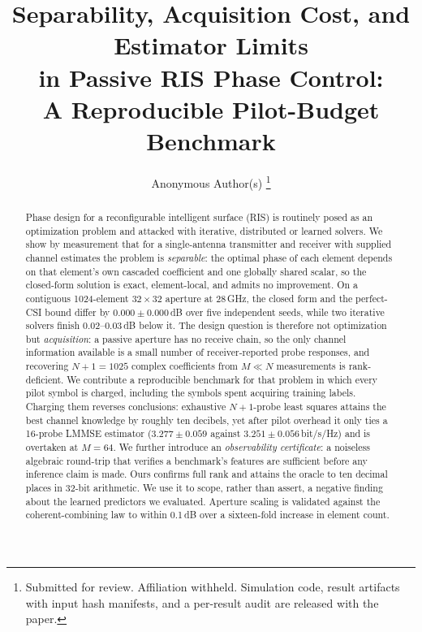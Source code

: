 \documentclass[journal]{IEEEtran}
\newcommand{\dB}{\,dB\xspace}
\begin{document}
\title{Separability, Acquisition Cost, and Estimator Limits\\ in Passive RIS Phase Control:\\ A Reproducible Pilot-Budget Benchmark}

\author{Anonymous Author(s)%
\thanks{Submitted for review. Affiliation withheld. Simulation code, result artifacts with input hash manifests, and a per-result audit are released with the paper.}}


\maketitle

\begin{abstract}
Phase design for a reconfigurable intelligent surface (RIS) is routinely posed as an optimization problem and attacked with iterative, distributed or learned solvers. We show by measurement that for a single-antenna transmitter and receiver with supplied channel estimates the problem is \emph{separable}: the optimal phase of each element depends on that element's own cascaded coefficient and one globally shared scalar, so the closed-form solution is exact, element-local, and admits no improvement. On a contiguous 1024-element $32\times32$ aperture at 28\,GHz, the closed form and the perfect-CSI bound differ by $0.000\pm0.000$\dB over five independent seeds, while two iterative solvers finish 0.02--0.03\dB below it. The design question is therefore not optimization but \emph{acquisition}: a passive aperture has no receive chain, so the only channel information available is a small number of receiver-reported probe responses, and recovering $N+1=1025$ complex coefficients from $M\ll N$ measurements is rank-deficient. We contribute a reproducible benchmark for that problem in which every pilot symbol is charged, including the symbols spent acquiring training labels. Charging them reverses conclusions: exhaustive $N+1$-probe least squares attains the best channel knowledge by roughly ten decibels, yet after pilot overhead it only ties a 16-probe LMMSE estimator ($3.277\pm0.059$ against $3.251\pm0.056$\,bit/s/Hz) and is overtaken at $M=64$. We further introduce an \emph{observability certificate}: a noiseless algebraic round-trip that verifies a benchmark's features are sufficient before any inference claim is made. Ours confirms full rank and attains the oracle to ten decimal places in 32-bit arithmetic. We use it to scope, rather than assert, a negative finding about the learned predictors we evaluated. Aperture scaling is validated against the coherent-combining law to within 0.1\dB over a sixteen-fold increase in element count.
\end{abstract}
\end{document}
